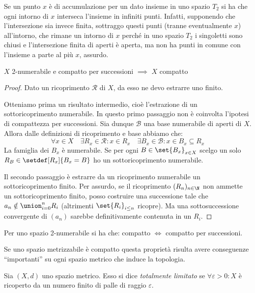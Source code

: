 \begin{oss}
	Se un punto $x$ è di accumulazione per un dato insieme in uno spazio $T_2$ si ha che ogni intorno di $x$ interseca l'insieme in infiniti punti.
	Infatti, supponendo che l'intersezione sia invece finita, sottraggo questi punti (tranne eventualmente $x$) all'intorno, che rimane un intorno di $x$ perché in uno spazio $T_2$ i singoletti sono chiusi e l'intersezione finita di aperti è aperta, ma non ha punti in comune con l'insieme a parte al più $x$, assurdo.
\end{oss}

\begin{prop}
	$X$ 2-numerabile e compatto per successioni $\implies$ $X$ compatto
\end{prop}

\begin{proof}
	Dato un ricoprimento $\mathcal R$ di $X$, da esso ne devo estrarre uno finito.
	
	Otteniamo prima un risultato intermedio, cioè l'estrazione di un sottoricoprimento numerabile.
	In questo primo passaggio non è coinvolta l'ipotesi di compattezza per successioni.
	Sia dunque $\mathcal B$ una base numerabile di aperti di $X$.
	Allora dalle definizioni di ricoprimento e base abbiamo che:
	\[\forall x\in X \quad
	\exists R_x \in \mathcal R : x\in R_x \quad
	\exists B_x \in \mathcal B : x\in B_x \subseteq R_x\]
	La famiglia dei $B_x$ è numerabile. Se per ogni $B\in\set{B_x}_{x\in X}$ scelgo un solo $R_B\in\setdef[R_x]{B_x=B}$ ho un sottoricoprimento numerabile.
	
	Il secondo passaggio è estrarre da un ricoprimento numerabile un sottoricoprimento finito.
	Per assurdo, se il ricoprimento $(R_n)_{n\in \N}$ non ammette un sottoricoprimento finito, posso costruire una successione tale che $a_n\notin\union_{i=0}^nR_i$ (altrimenti $\set{R_i}_{i\le n}$ ricopre).
	Ma una sottosuccessione convergente di $(a_n)$ sarebbe definitivamente contenuta in un $R_i$.
\end{proof}

\begin{cor}
	Per uno spazio 2-numerabile si ha che: compatto $\iff$ compatto per successioni.
\end{cor}


Se uno spazio metrizzabile è compatto questa proprietà risulta avere conseguenze ``importanti'' su ogni spazio metrico che induce la topologia.

\begin{defn}
	Sia $(X,d)$ uno spazio metrico. Esso si dice \emph{totalmente limitato} se $\forall \varepsilon > 0:X$ è ricoperto da un numero finito di palle di raggio $\varepsilon$.
\end{defn}

